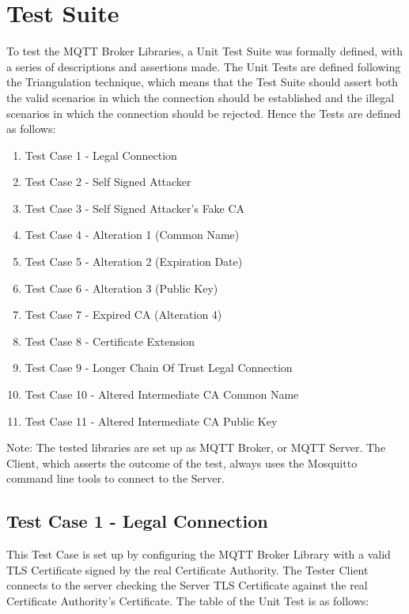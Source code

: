 \documentclass[binding=0.6cm,noexaminfo]{sapthesis}
\begin{document}
\chapter{Test Suite}
To test the MQTT Broker Libraries, a Unit Test Suite was formally defined, with a series of descriptions and assertions made. The Unit Tests are defined following the Triangulation technique, which means that the Test Suite should assert both the valid scenarios in which the connection should be established and the illegal scenarios in which the connection should be rejected. Hence the Tests are defined as follows:
\begin{enumerate}
	\item Test Case 1 - Legal Connection
	\item Test Case 2 - Self Signed Attacker
	\item Test Case 3 - Self Signed Attacker's Fake CA
	\item Test Case 4 - Alteration 1 (Common Name)
	\item Test Case 5 - Alteration 2 (Expiration Date)
	\item Test Case 6 - Alteration 3 (Public Key)
	\item Test Case 7 - Expired CA (Alteration 4)
	\item Test Case 8 - Certificate Extension
	\item Test Case 9 - Longer Chain Of Trust Legal Connection
	\item Test Case 10 - Altered Intermediate CA Common Name
	\item Test Case 11 - Altered Intermediate CA Public Key
\end{enumerate}
Note: The tested libraries are set up as MQTT Broker, or MQTT Server. The Client, which asserts the outcome of the test, always uses the Mosquitto command line tools to connect to the Server.

\section{Test Case 1 - Legal Connection}
This Test Case is set up by configuring the MQTT Broker Library with a valid TLS Certificate signed by the real Certificate Authority. The Tester Client connects to the server checking the Server TLS Certificate against the real Certificate Authority’s Certificate. The table of the Unit Test is as follows:
\end{document}
